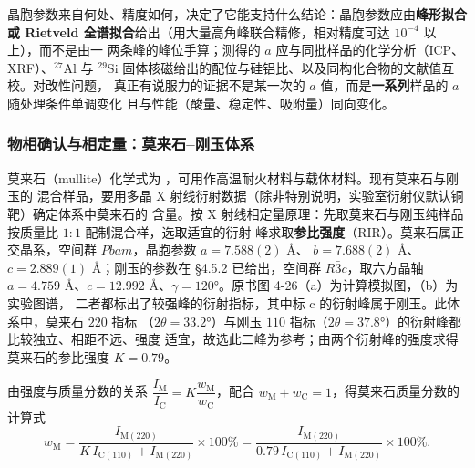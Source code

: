 \begin{crosscheck}
晶胞参数来自何处、精度如何，决定了它能支持什么结论：晶胞参数应由\textbf{峰形拟合或
Rietveld 全谱拟合}给出（用大量高角峰联合精修，相对精度可达 $10^{-4}$ 以上），而不是由一
两条峰的峰位手算；测得的 $a$ 应与同批样品的化学分析（ICP、XRF）、$^{27}\mathrm{Al}$ 与
$^{29}\mathrm{Si}$ 固体核磁给出的配位与硅铝比、以及同构化合物的文献值互校。对改性问题，
真正有说服力的证据不是某一次的 $a$ 值，而是\textbf{一系列}样品的 $a$ 随处理条件单调变化
且与性能（酸量、稳定性、吸附量）同向变化。
\end{crosscheck}

\subsubsection{物相确认与相定量：莫来石--刚玉体系}

\begin{principle}
莫来石（mullite）化学式为 ，可用作高温耐火材料与载体材料。现有莫来石与刚玉的
混合样品，要用多晶 X 射线衍射数据（除非特别说明，实验室衍射仪默认铜靶）确定体系中莫来石的
含量。按 X 射线相定量原理：先取莫来石与刚玉纯样品按质量比 $1:1$ 配制混合样，选取适宜的衍射
峰求取\textbf{参比强度}（RIR）。莫来石属正交晶系，空间群 $Pbam$，晶胞参数 $a=7.588(2)$ Å、
$b=7.688(2)$ Å、$c=2.889(1)$ Å；刚玉的参数在 §4.5.2 已给出，空间群 $R\bar{3}c$，取六方晶轴
$a=4.759$ Å、$c=12.992$ Å、$\gamma=120°$。原书图 4-26（a）为计算模拟图，（b）为实验图谱，
二者都标出了较强峰的衍射指标，其中标 c 的衍射峰属于刚玉。此体系中，莫来石 $220$ 指标
（$2\theta=33.2°$）与刚玉 $110$ 指标（$2\theta=37.8°$）的衍射峰都比较独立、相距不远、强度
适宜，故选此二峰为参考；由两个衍射峰的强度求得莫来石的参比强度 $K=0.79$。

由强度与质量分数的关系 $\dfrac{I_{\mathrm{M}}}{I_{\mathrm{C}}}=K\dfrac{w_{\mathrm{M}}}
{w_{\mathrm{C}}}$，配合 $w_{\mathrm{M}}+w_{\mathrm{C}}=1$，得莫来石质量分数的计算式
\begin{equation}
w_{\mathrm{M}}=\frac{I_{\mathrm{M}(220)}}{K\,I_{\mathrm{C}(110)}+I_{\mathrm{M}(220)}}
\times100\%=\frac{I_{\mathrm{M}(220)}}{0.79\,I_{\mathrm{C}(110)}+I_{\mathrm{M}(220)}}\times100\% .
\label{eq:ch04c-rir}
\end{equation}
\end{principle}

